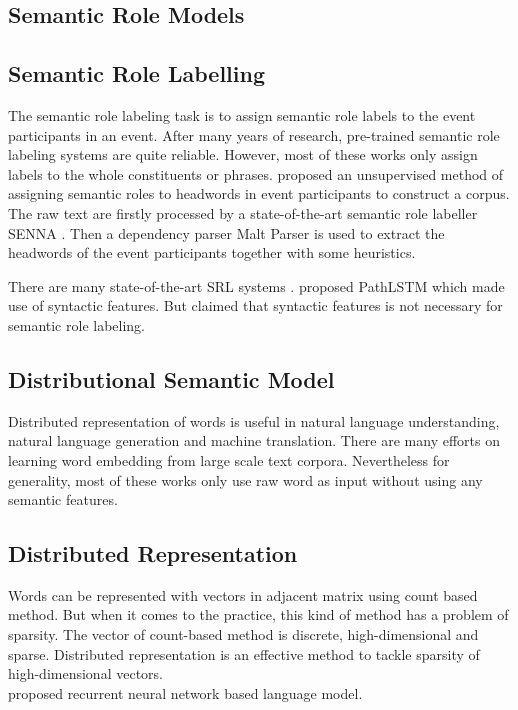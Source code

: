 \documentclass[a4paper]{article}
\begin{document}
\subsection{Semantic Role Models} \label{sec:semanticrole}


\subsection{Semantic Role Labelling} \label{sec:srl}
The semantic role labeling task is to assign semantic role labels to the event participants in an event. After many years of research, pre-trained semantic role labeling systems are quite reliable. However, most of these works only assign labels to the whole constituents or phrases. \citet{Sayeed2014} proposed an unsupervised method of assigning semantic roles to headwords in event participants to construct a corpus. The raw text are firstly processed by a state-of-the-art semantic role labeller SENNA \citep{Collobert}. Then a dependency parser Malt Parser is used to extract the headwords of the event participants together with some heuristics.

There are many state-of-the-art SRL systems \citep{collobert2011natural, titov2011bayesian}. \citet{roth2016neural} proposed PathLSTM which made use of syntactic features. But \citet{marcheggiani2017simple} claimed that syntactic features is not necessary for semantic role labeling.

\subsection{Distributional Semantic Model} \label{sec:dsm}
Distributed representation of words is useful in natural language understanding, natural language generation and machine translation. There are many efforts on learning word embedding from large scale text corpora. Nevertheless for generality, most of these works only use raw word as input without using any semantic features. 


\subsection{Distributed Representation} \label{sec:repr}
Words can be represented with vectors in adjacent matrix using count based method. But when it comes to the practice, this kind of method has a problem of sparsity. The vector of count-based method is discrete, high-dimensional and sparse. Distributed representation is an effective method to tackle sparsity of high-dimensional vectors. \\
\noindent
\citet{mikolov2013distributed} proposed recurrent neural network based language model.
\end{document}
